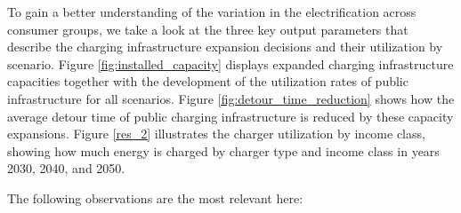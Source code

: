         To gain a better understanding of the variation in the electrification across consumer groups, we take a look at the three key output parameters that describe the charging infrastructure expansion decisions and their utilization by scenario. Figure \ref{fig:installed_capacity} displays expanded charging infrastructure capacities together with the development of the utilization rates of public infrastructure for all scenarios. 
        Figure \ref{fig:detour_time_reduction} shows how the average detour time of public charging infrastructure is reduced by these capacity expansions. Figure \ref{res_2} illustrates the charger utilization by income class, showing how much energy is charged by charger type and income class in years 2030, 2040, and 2050.
        
        The following observations are the most relevant here:
